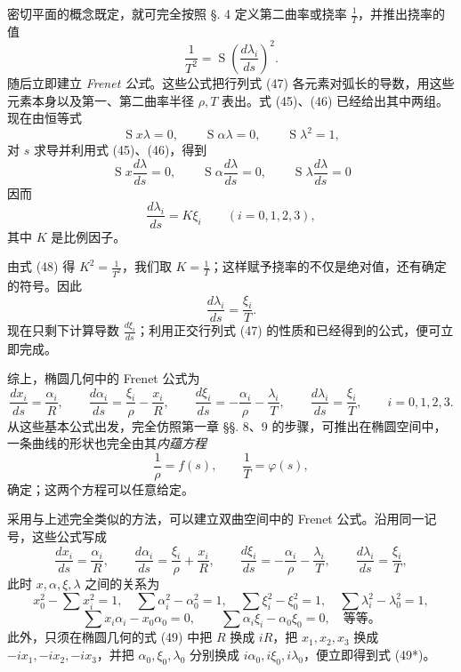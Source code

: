 密切平面的概念既定，就可完全按照 §. 4 定义第二曲率或挠率 \(\frac1T\)，并推出挠率的值
\[
\tag{48}
 \frac1{T^2}=\mathop{\mathrm{S}}\left(\frac{d\lambda_i}{ds}\right)^2.
\]
随后立即建立 \emph{Frenet 公式}。这些公式把行列式 (47) 各元素对弧长的导数，用这些元素本身以及第一、第二曲率半径 \(\rho,T\) 表出。式 (45)、(46) 已经给出其中两组。现在由恒等式
\[
 \mathop{\mathrm{S}}x\lambda=0,
 \qquad \mathop{\mathrm{S}}\alpha\lambda=0,
 \qquad \mathop{\mathrm{S}}\lambda^2=1,
\]
对 \(s\) 求导并利用式 (45)、(46)，得到
\[
 \mathop{\mathrm{S}}x\frac{d\lambda}{ds}=0,
 \qquad \mathop{\mathrm{S}}\alpha\frac{d\lambda}{ds}=0,
 \qquad \mathop{\mathrm{S}}\lambda\frac{d\lambda}{ds}=0
\]
因而
\[
 \frac{d\lambda_i}{ds}=K\xi_i\qquad (i=0,1,2,3),
\]
其中 \(K\) 是比例因子。

由式 (48) 得 \(K^2=\frac1{T^2}\)，我们取 \(K=\frac1T\)；这样赋予挠率的不仅是绝对值，还有确定的符号。因此
\[
 \frac{d\lambda_i}{ds}=\frac{\xi_i}{T}.
\]
现在只剩下计算导数 \(\frac{d\xi_i}{ds}\)；利用正交行列式 (47) 的性质和已经得到的公式，便可立即完成。

综上，椭圆几何中的 Frenet 公式为
\[
\tag{49}
 \frac{dx_i}{ds}=\frac{\alpha_i}{R},
 \qquad
 \frac{d\alpha_i}{ds}=\frac{\xi_i}{\rho}-\frac{x_i}{R},
 \qquad
 \frac{d\xi_i}{ds}=-\frac{\alpha_i}{\rho}-\frac{\lambda_i}{T},
 \qquad
 \frac{d\lambda_i}{ds}=\frac{\xi_i}{T},
 \qquad i=0,1,2,3.
\]
从这些基本公式出发，完全仿照第一章 §§. 8、9 的步骤，可推出在椭圆空间中，一条曲线的形状也完全由其\emph{内蕴方程}
\[
 \frac1\rho=f(s),
 \qquad \frac1T=\varphi(s),
\]
确定；这两个方程可以任意给定。

采用与上述完全类似的方法，可以建立双曲空间中的 Frenet 公式。沿用同一记号，这些公式写成
\[
\tag{49*}
 \frac{dx_i}{ds}=\frac{\alpha_i}{R},
 \qquad
 \frac{d\alpha_i}{ds}=\frac{\xi_i}{\rho}+\frac{x_i}{R},
 \qquad
 \frac{d\xi_i}{ds}=-\frac{\alpha_i}{\rho}-\frac{\lambda_i}{T},
 \qquad
 \frac{d\lambda_i}{ds}=\frac{\xi_i}{T},
\]
此时 \(x,\alpha,\xi,\lambda\) 之间的关系为
\[
 x_0^2-\sum x_i^2=1,
 \quad \sum\alpha_i^2-\alpha_0^2=1,
 \quad \sum\xi_i^2-\xi_0^2=1,
 \quad \sum\lambda_i^2-\lambda_0^2=1,
\]
\[
 \sum x_i\alpha_i-x_0\alpha_0=0,
 \qquad
 \sum\alpha_i\xi_i-\alpha_0\xi_0=0,
 \quad \text{等等。}
\]
此外，只须在椭圆几何的式 (49) 中把 \(R\) 换成 \(iR\)，把 \(x_1,x_2,x_3\) 换成 \(-ix_1,-ix_2,-ix_3\)，并把 \(\alpha_0,\xi_0,\lambda_0\) 分别换成 \(i\alpha_0,i\xi_0,i\lambda_0\)，便立即得到式 (49*)。
